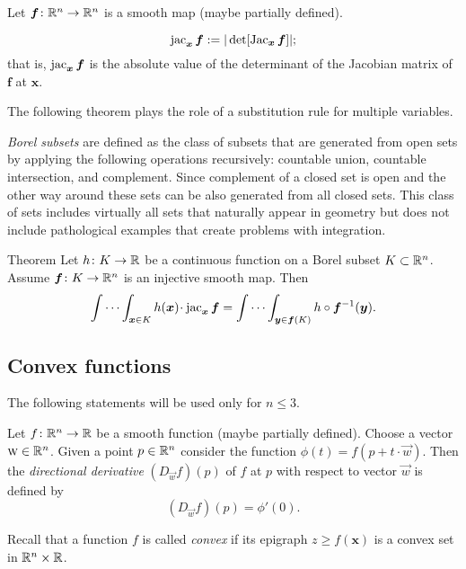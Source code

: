 Let $\bm{f}\colon\mathbb{R}^n\to\mathbb{R}^n$ is a smooth map (maybe partially defined).

\[\jac_{\bm{x}}\bm{f}\df|\det[\Jac_{\bm{x}}\bm{f}]|;\index{10j@$\jac$}\]
that is, $\mathop{\rm jac}\nolimits_{\bm{x}}\bm{f}$ is the absolute value of the determinant of the Jacobian matrix of $\bm{f}$ at $\bm{x}$.

The following theorem plays the role of a substitution rule for multiple variables.

\emph{Borel subsets} are defined as the class of subsets that are generated from open sets by applying the following operations recursively: countable union, countable intersection, and complement.
Since complement of a closed set is open and the other way around these sets can be also generated from all closed sets.
This class of sets includes virtually all sets that naturally appear in geometry but does not include pathological examples that create problems with integration.



\begin{thm}{Theorem}\label{thm:mult-substitution} %
Let $h\colon K\to\mathbb{R}$ be a continuous function on a Borel subset $K\subset \mathbb{R}^n$.
Assume $\bm{f}\colon K\to \mathbb{R}^n$ is an injective smooth map.
Then 
\[\idotsint_{\bm{x}\in K} h(\bm{x})\cdot \jac_{\bm{x}}\bm{f}
=
\idotsint_{\bm{y}\in \bm{f}(K)} h\circ \bm{f}^{-1}(\bm{y}).\]

\end{thm}

\subsection*{Convex functions}

The following statements will be used only for $n\le 3$.

Let $f\colon\mathbb{R}^n\to \mathbb{R}$ be a smooth function (maybe partially defined).
Choose a vector $\text{\sc{w}}\in \mathbb{R}^n$.
Given a point $p\in\mathbb{R}^n$ consider the function $\phi(t)=f(p+t\cdot \vec w)$.
Then the \emph{directional derivative} $(D_{\vec w}f)(p)$ of $f$ at $p$ with respect to vector $\vec w$ is defined by
\[(D_{\vec w}f)(p)=\phi'(0).\]

Recall that a function $f$ is called \emph{convex} if 
its epigraph $z\ge f(\bm{x})$ is a convex set in $\mathbb{R}^n\times \mathbb{R}$.


